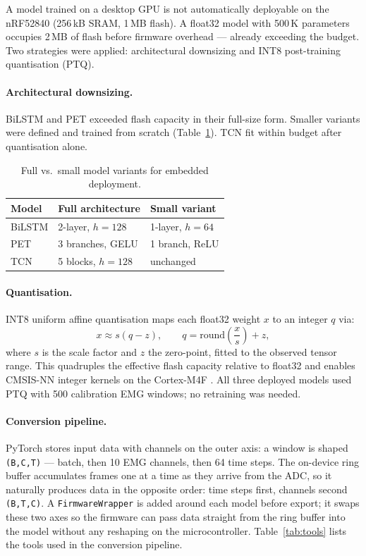 \documentclass[11pt]{article}
\begin{document}
A model trained on a desktop GPU is not automatically deployable on the nRF52840 (256\,kB SRAM, 1\,MB flash). A float32 model with 500\,K parameters occupies 2\,MB of flash before firmware overhead — already exceeding the budget. Two strategies were applied: architectural downsizing and INT8 post-training quantisation (PTQ).

\paragraph{Architectural downsizing.}
BiLSTM and PET exceeded flash capacity in their full-size form. Smaller variants were defined and trained from scratch (Table~\ref{tab:small}). TCN fit within budget after quantisation alone.

\begin{table}[H]
\centering
\caption{Full vs.\ small model variants for embedded deployment.}
\label{tab:small}
\begin{tabular}{lll}
\toprule
\textbf{Model} & \textbf{Full architecture} & \textbf{Small variant} \\
\midrule
BiLSTM  & 2-layer, $h{=}128$ & 1-layer, $h{=}64$ \\
PET     & 3 branches, GELU   & 1 branch, ReLU \\
TCN     & 5 blocks, $h{=}128$ & unchanged \\
\bottomrule
\end{tabular}
\end{table}

\paragraph{Quantisation.}
INT8 uniform affine quantisation maps each float32 weight $x$ to an integer $q$ via:
\begin{equation}
x \approx s(q-z), \qquad q = \mathrm{round}\!\left(\frac{x}{s}\right) + z,
\end{equation}
where $s$ is the scale factor and $z$ the zero-point, fitted to the observed tensor range. This quadruples the effective flash capacity relative to float32 and enables CMSIS-NN integer kernels on the Cortex-M4F \cite{tf_ptq,litert_int8_spec}. All three deployed models used PTQ with 500 calibration EMG windows; no retraining was needed.

\paragraph{Conversion pipeline.}
PyTorch stores input data with channels on the outer axis: a window is shaped \texttt{(B,C,T)} — batch, then 10 EMG channels, then 64 time steps. The on-device ring buffer accumulates frames one at a time as they arrive from the ADC, so it naturally produces data in the opposite order: time steps first, channels second \texttt{(B,T,C)}. A \texttt{FirmwareWrapper} is added around each model before export; it swaps these two axes so the firmware can pass data straight from the ring buffer into the model without any reshaping on the microcontroller. Table~\ref{tab:tools} lists the tools used in the conversion pipeline.
\end{document}

